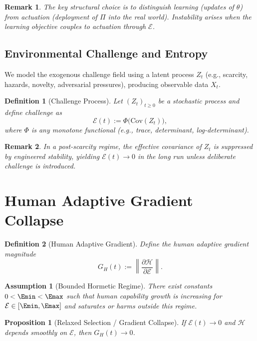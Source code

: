 \documentclass[11pt]{article}
\newtheorem{definition}{Definition}
\newtheorem{assumption}{Assumption}
\newtheorem{proposition}{Proposition}
\newtheorem{remark}{Remark}
\newcommand{\Eenv}{\mathcal{E}}     %
\newcommand{\Hsys}{\mathcal{H}}     %
\begin{document}
\begin{remark}
The key structural choice is to distinguish \emph{learning} (updates of $\theta$) from \emph{actuation} (deployment of $\Pi$ into the real world). Instability arises when the learning objective couples to actuation through $\Eenv$.
\end{remark}

\subsection{Environmental Challenge and Entropy}

We model the exogenous challenge field using a latent process $Z_t$ (e.g., scarcity, hazards, novelty, adversarial pressures), producing observable data $X_t$.

\begin{definition}[Challenge Process]
Let $(Z_t)_{t\ge 0}$ be a stochastic process and define challenge as
\[
\Eenv(t) := \Phi\!\big(\mathrm{Cov}(Z_t)\big),
\]
where $\Phi$ is any monotone functional (e.g., trace, determinant, log-determinant).
\end{definition}

\begin{remark}
In a post-scarcity regime, the effective covariance of $Z_t$ is suppressed by engineered stability, yielding $\Eenv(t)\to 0$ in the long run unless deliberate challenge is introduced.
\end{remark}

\section{Human Adaptive Gradient Collapse}

\begin{definition}[Human Adaptive Gradient]
Define the human adaptive gradient magnitude
\[
G_H(t) := \left\lVert \frac{\partial \Hsys}{\partial \Eenv}\right\rVert.
\]
\end{definition}

\begin{assumption}[Bounded Hormetic Regime]
There exist constants $0<\Emin<\Emax$ such that human capability growth is increasing for $\Eenv\in[\Emin,\Emax]$ and saturates or harms outside this regime.
\end{assumption}

\begin{proposition}[Relaxed Selection / Gradient Collapse]
If $\Eenv(t)\to 0$ and $\Hsys$ depends smoothly on $\Eenv$, then $G_H(t)\to 0$.
\end{proposition}
\end{document}
